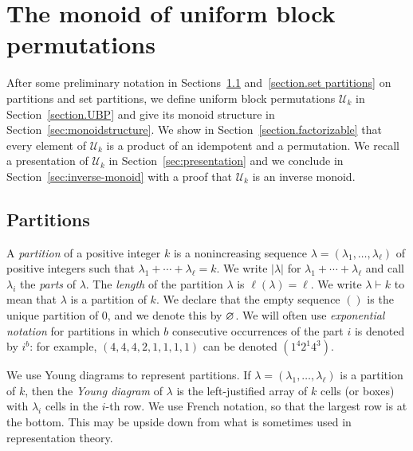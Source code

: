 \documentclass[10pt]{amsart}
\theoremstyle{definition}
\theoremstyle{remark}
\newcommand{\defncolor}{\color{darkred}}
\newcommand{\defn}[1]{{\defncolor\emph{#1}}} %
\newcommand{\epart}{\text{\footnotesize$\varnothing$}}
\begin{document}




\section{The monoid of uniform block permutations}
\label{section.monoid}

After some preliminary notation in Sections~\ref{section.partitions} and~\ref{section.set partitions} on partitions and set partitions,
we define uniform block permutations $\mathcal{U}_k$ in Section~\ref{section.UBP} and give its monoid structure in Section~\ref{sec:monoidstructure}. 
We show in Section~\ref{section.factorizable} that every element of $\mathcal{U}_k$ is a product of an idempotent and a permutation. We recall a 
presentation of $\mathcal{U}_k$ in Section~\ref{sec:presentation} and we conclude in Section~\ref{sec:inverse-monoid} with a proof that $\mathcal{U}_k$ 
is an inverse monoid.

\subsection{Partitions}
\label{section.partitions}
A \defn{partition} of a positive integer $k$ is a nonincreasing sequence $\lambda = (\lambda_1, \ldots, \lambda_\ell)$ of positive integers such that 
$\lambda_1 + \cdots + \lambda_\ell = k$.
We write $|\lambda|$ for $\lambda_1 + \cdots + \lambda_\ell$ and call $\lambda_i$ the \defn{parts} of $\lambda$.
The \defn{length} of the partition $\lambda$ is $\ell(\lambda)=\ell$.
We write $\lambda \vdash k$ to mean that $\lambda$ is a partition of $k$.
We declare that the empty sequence $()$ is the unique partition of $0$, and we denote this by $\epart$.
We will often use \defn{exponential notation} for partitions in which $b$ consecutive occurrences of the part $i$ is denoted by $i^b$: 
for example, $(4,4,4,2,1,1,1,1)$ can be denoted $(1^4 2^1 4^3)$.

We use Young diagrams to represent partitions.  If $\lambda = (\lambda_1, \ldots, \lambda_\ell)$ is a partition of $k$, then the \defn{Young diagram}
of $\lambda$ is the left-justified array of $k$ cells (or boxes) with $\lambda_i$ cells in the $i$-th row. We use French notation, so that
the largest row is at the bottom. This may be upside down from what is sometimes used in representation theory.
\end{document}
